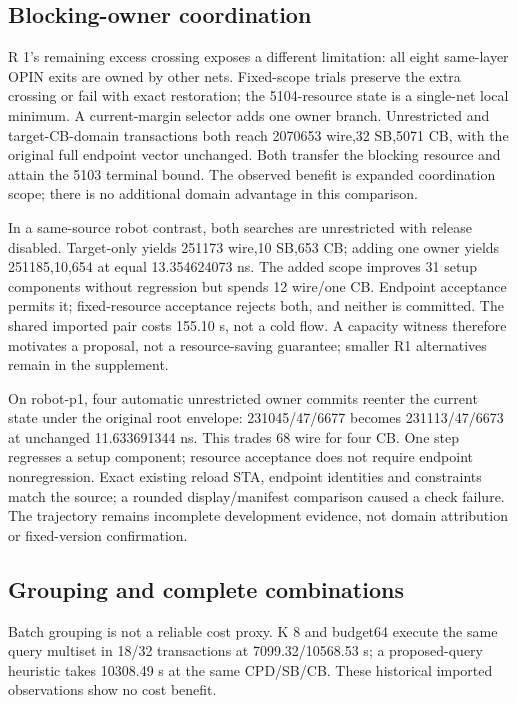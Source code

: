 \documentclass[conference,10pt]{IEEEtran}
\begin{document}
\subsection{Blocking-owner coordination}
R 1's remaining excess crossing exposes a different limitation: all eight same-layer OPIN exits are owned by other nets. Fixed-scope trials preserve the extra crossing or fail with exact restoration; the 5104-resource state is a single-net local minimum. A current-margin selector adds one owner branch. Unrestricted and target-CB-domain transactions both reach 2070653 wire,32 SB,5071 CB, with the original full endpoint vector unchanged. Both transfer the blocking resource and attain the 5103 terminal bound. The observed benefit is expanded coordination scope; there is no additional domain advantage in this comparison.

In a same-source robot contrast, both searches are unrestricted with release disabled. Target-only yields 251173 wire,10 SB,653 CB; adding one owner yields 251185,10,654 at equal 13.354624073 ns. The added scope improves 31 setup components without regression but spends 12 wire/one CB. Endpoint acceptance permits it; fixed-resource acceptance rejects both, and neither is committed. The shared imported pair costs 155.10 s, not a cold flow. A capacity witness therefore motivates a proposal, not a resource-saving guarantee; smaller R1 alternatives remain in the supplement.

On robot-p1, four automatic unrestricted owner commits reenter the current state under the original root envelope: 231045/47/6677 becomes 231113/47/6673 at unchanged 11.633691344 ns. This trades 68 wire for four CB. One step regresses a setup component; resource acceptance does not require endpoint nonregression. Exact existing reload STA, endpoint identities and constraints match the source; a rounded display/manifest comparison caused a check failure. The trajectory remains incomplete development evidence, not domain attribution or fixed-version confirmation.

\subsection{Grouping and complete combinations}
Batch grouping is not a reliable cost proxy. K 8 and budget64 execute the same query multiset in 18/32 transactions at 7099.32/10568.53 s; a proposed-query heuristic takes 10308.49 s at the same CPD/SB/CB. These historical imported observations show no cost benefit.
\end{document}
